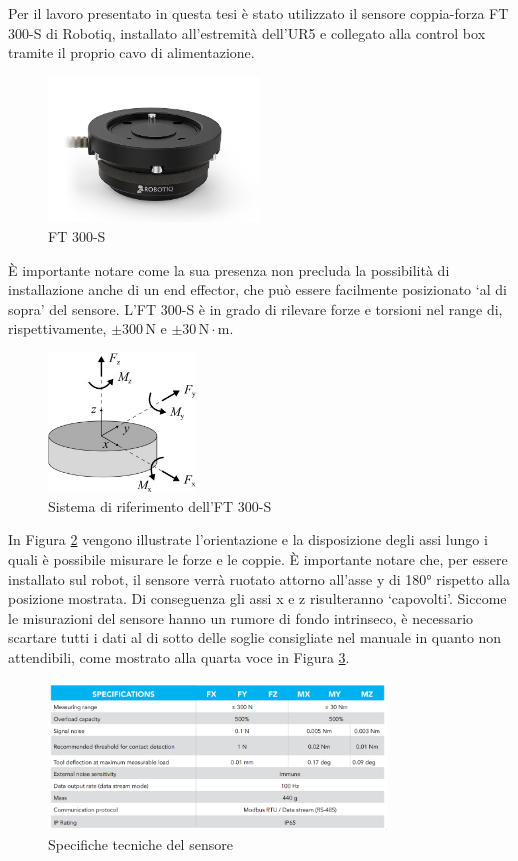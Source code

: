 Per il lavoro presentato in questa tesi è stato utilizzato il sensore coppia-forza FT 300-S di Robotiq, installato all'estremit\`{a} 
dell'UR5 e collegato alla control box tramite il proprio cavo di alimentazione. 
\begin{figure}[H]
    \centering
    \includegraphics*[width=0.5\textwidth]{images/ft.png}
    \caption{FT 300-S}
    \label{fig:ft}
\end{figure}
\`{E} importante notare come la sua presenza non precluda la possibilit\`{a} di installazione anche di un end effector, 
che pu\`{o} essere facilmente posizionato `al di sopra' del sensore. 
L'FT 300-S \`{e} in grado di rilevare forze e torsioni nel range di, rispettivamente, $\pm 300 \, \text{N}$ e $\pm 30 \, \text{N} \cdot \text{m}$. 
\begin{figure}[H]
    \centering
    \includegraphics*[width=0.35\textwidth]{images/ft_axes.jpg}
    \caption{Sistema di riferimento dell'FT 300-S}
    \label{fig:ft_axes}
\end{figure}
In Figura \ref{fig:ft_axes} vengono illustrate l'orientazione e la disposizione degli assi lungo i quali \`{e} possibile misurare le 
forze e le coppie. \`{E} importante notare che, per essere installato sul robot, il sensore verr\`{a} ruotato attorno all'asse y di 180° 
rispetto alla posizione mostrata. Di conseguenza gli assi x e z risulteranno `capovolti'.
Siccome le misurazioni del sensore hanno un rumore di fondo intrinseco, \`{e} necessario scartare tutti i dati al di sotto delle 
soglie consigliate nel manuale \cite{ft_sensor} in quanto non attendibili, come mostrato alla quarta voce in Figura \ref{fig:data_sheet}.
\begin{figure}[H]
    \centering
    \includegraphics*[width=0.8\textwidth]{images/data_sheet.png}
    \caption{Specifiche tecniche del sensore}
    \label{fig:data_sheet}
\end{figure}
